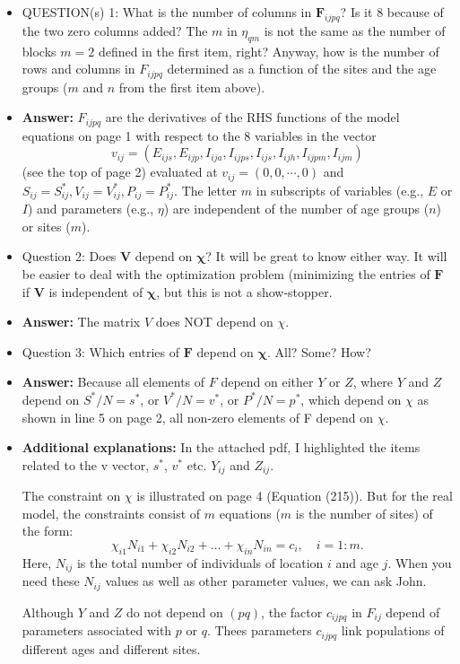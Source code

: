 \documentclass[12pt]{amsart}
\theoremstyle{definition}
\begin{document}
\begin{itemize}
\item QUESTION(s) 1: What is the number of columns in $\bm{F}_{ijpq}$? Is it $8$ because of the two zero columns added? The $m$ in $\eta_{qm}$ is not the same as the number of blocks $m=2$ defined in the first item, right? Anyway, how is the number of rows and columns in $F_{ijpq}$ determined as a function of the sites and the age groups  ($m$ and $n$  from the first item above).

\item {\bf Answer:} $F_{ijpq}$ are the derivatives of the RHS functions of the model equations on page 1 with respect to the 8 variables in the vector \[
v_{ij}=( E_{ijs}, E_{ijp}, I_{ija}, I_{ijps}, I_{ijs}, I_{ijh}, I_{ijpm}, I_{ijm} ) 
\]
(see the top of page 2) evaluated at $v_{ij}=(0,0,\cdots, 0)$
and $S_{ij}=S^*_{ij}, V_{ij}=V^*_{ij}, P_{ij}=P^*_{ij}$.  The letter $m$ in subscripts of variables (e.g., $E$ or $I$) and parameters (e.g., $\eta$) are independent of the number of age groups ($n$) or sites ($m$).

\item Question 2: Does $\bm{V}$ depend on $\bm{\chi}$? It will be great to know either way. It will be easier to deal with the optimization problem (minimizing the entries of $\bm F$ if $\bm V$ is independent of $\bm \chi$, but this is not a show-stopper.

\item {\bf Answer:} The matrix $V$ does NOT depend on $\chi$.
 
\item Question 3: Which entries of $\bm F$ depend on $\bm \chi$. All? Some? How?

\item {\bf Answer:} Because all elements of $F$ depend on either $Y$ or $Z$, where $Y$ and $Z$ depend on $S^*/N=s^*$, or $V^*/N=v^*$, or $P^*/N=p^*$, which depend on $\chi$ as shown in line 5 on page 2, all non-zero elements of F depend on $\chi$.

\item {\bf Additional explanations:} In the attached pdf, I highlighted the items related to the v vector, $s^*$, $v^*$ etc. $Y_{ij}$ and $Z_{ij}$.
 
The constraint on $\chi$ is illustrated on page 4 (Equation (215)). But for the real model, the constraints consist of $m$ equations ($m$ is the number of sites) of the form:
\[
\chi_{i1}N_{i1} +\chi_{i2}N_{i2}+\ldots +\chi_{in}N_{in}=c_i,     \quad i=1:m.
\] 
Here, $N_{ij}$ is the total number of individuals of location  $i$ and age $j$. When you need these $N_{ij}$ values as well as other parameter values, we can ask John.
 
Although $Y$ and $Z$ do not depend on $(pq)$, the factor $c_{ijpq}$ in $F_{ij}$ depend of parameters associated with $p$ or $q$. Thees parameters $c_{ijpq}$ link populations of different ages and different sites.
 
\end{itemize}
\end{document}
